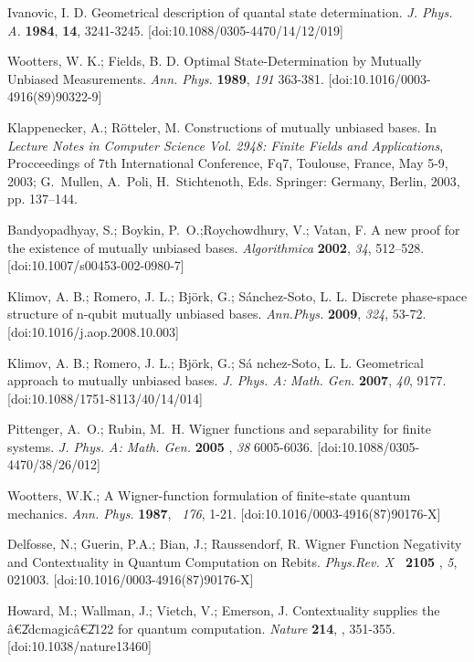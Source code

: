 \documentclass{article}
\begin{document}
\begin{thebibliography}{99}
 Ivanovic, I. D. Geometrical description of quantal state
determination. \textit{J. Phys. A.} \textbf{1984}, \textbf{14}, 3241-3245.
[doi:10.1088/0305-4470/14/12/019]

 Wootters, W. K.; Fields, B. D. Optimal State-Determination
by Mutually Unbiased Measurements. \textit{Ann. Phys.} \textbf{1989}, 
\textit{191} 363-381. [doi:10.1016/0003-4916(89)90322-9]

 Klappenecker, A.; R{\"{o}}tteler, M. Constructions of
mutually unbiased bases. In \textit{Lecture Notes in Computer Science Vol.
2948: Finite Fields and Applications}, Procceedings of 7th International
Conference, Fq7, Toulouse, France, May 5-9, 2003; G.~Mullen, A.~Poli,
H.~Stichtenoth, Eds. Springer: Germany, Berlin, 2003, pp. 137--144.

 Bandyopadhyay, S.; Boykin, P.~O.;Roychowdhury,
V.; Vatan, F. A new proof for the existence of mutually unbiased bases. 
\textit{Algorithmica} \textbf{2002}, \textit{34}, 512--528.
[doi:10.1007/s00453-002-0980-7]

 Klimov, A. B.; Romero, J. L.; Bj\"{o}rk, G.; S\'{a}nchez-Soto,
L. L. Discrete phase-space structure of n-qubit mutually unbiased bases. 
\textit{Ann.Phys.} \textbf{2009}, \textit{324}, 53-72.
[doi:10.1016/j.aop.2008.10.003]

 Klimov, A. B.; Romero, J. L.; Bj{\"{o}}rk, G.; S{\'{a}}%
nchez-Soto, L. L. Geometrical approach to mutually unbiased bases. \textit{%
J. Phys. A: Math. Gen.} \textbf{2007}, \textit{40}, 9177.
[doi:10.1088/1751-8113/40/14/014]

 Pittenger, A.~O.; Rubin, M.~H. Wigner functions and
separability for finite systems. \textit{J. Phys. A: Math. Gen.} \textbf{2005%
}, \textit{38} 6005-6036. [doi:10.1088/0305-4470/38/26/012]

 Wootters, W.K.; A Wigner-function formulation of
finite-state quantum mechanics. \textit{Ann. Phys.} \textbf{1987}, \textit{\
176}, 1-21. [doi:10.1016/0003-4916(87)90176-X]

 Delfosse, N.; Guerin, P.A.; Bian, J.; Raussendorf, R. Wigner
Function Negativity and Contextuality in Quantum Computation on Rebits. 
\textit{Phys.Rev. X} \textbf{\ 2105 }, \textit{5}, 021003.
[doi:10.1016/0003-4916(87)90176-X]

 Howard, M.; Wallman, J.; Vietch, V.; Emerson, J.
Contextuality supplies the \^{a}\euro \U{2dc}magic\^{a}\euro \U{2122} for
quantum computation. \textit{Nature} \textbf{214}, \texit{510}, 351-355.
[doi:10.1038/nature13460]


\end{thebibliography}
\end{document}
